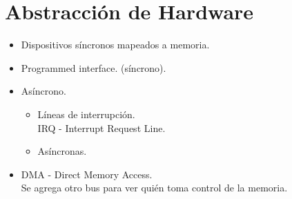 \chapter{Abstracci\'{o}n de Hardware}
\begin{itemize}
	\item Dispositivos s\'{i}ncronos mapeados a memoria.
	\item Programmed interface. (s\'{i}ncrono).
	\item As\'{i}ncrono.
	\begin{itemize}
		\item L\'{i}neas de interrupci\'{o}n.\\
			IRQ - Interrupt Request Line.
		\item As\'{i}ncronas.
	\end{itemize}
	\item DMA - Direct Memory Access.\\
	Se agrega otro bus para ver qui\'{e}n toma control de la memoria.
\end{itemize}
